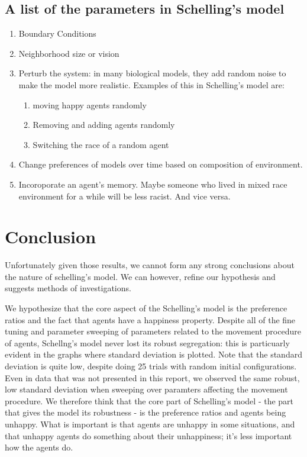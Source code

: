 \documentclass[11pt,twoside]{amsart}
\theoremstyle{theorem}
\theoremstyle{definition}
\theoremstyle{remark}
\begin{document}
\subsection{A list of the parameters in Schelling's model}
    \begin{enumerate}
        \item Boundary Conditions
        \item Neighborhood size or vision
        \item Perturb the system: in many biological models, they add random noise to make the model more realistic. 
            Examples of this in Schelling's model are:
            \begin{enumerate}
                \item moving happy agents randomly
                \item Removing and adding agents randomly
                \item Switching the race of a random agent
            \end{enumerate}
        \item Change preferences of models over time based on composition of environment. 
        \item Incoroporate an agent's memory. Maybe someone who lived in mixed race environment for a while will be less racist. And vice versa.
    \end{enumerate}

\section{Conclusion}
Unfortunately given those results, we cannot form any strong conclusions about the nature of schelling's model.
We can however, refine our hypothesis and suggests methods of investigations.

We hypothesize that the core aspect of the Schelling's model is the preference ratios and the fact that agents have a happiness property.
Despite all of the fine tuning and parameter sweeping of parameters related to the movement procedure of agents, Schellng's model never lost its robust segregation: this is particuarly evident in the graphs where standard deviation is plotted. 
Note that the standard deviation is quite low, despite doing 25 trials with random initial configurations. 
Even in data that was not presented in this report, we observed the same robust, low standard deviation when sweeping over paramters affecting the movement procedure. 
We therefore think that the core part of Schelling's model - the part that gives the model its robustness - is the preference ratios and agents being unhappy. 
What is important is that agents are unhappy in some situations, and that unhappy agents do something about their unhappiness; it's less important how the agents do.
\end{document}
